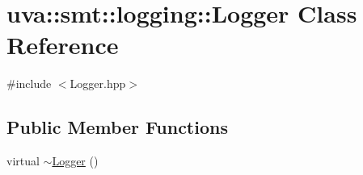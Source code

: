\hypertarget{classuva_1_1smt_1_1logging_1_1_logger}{}\section{uva\+:\+:smt\+:\+:logging\+:\+:Logger Class Reference}
\label{classuva_1_1smt_1_1logging_1_1_logger}


{\ttfamily \#include $<$Logger.\+hpp$>$}

\subsection*{Public Member Functions}
\begin{DoxyCompactItemize}
\item 
virtual \hyperlink{classuva_1_1smt_1_1logging_1_1_logger_a3513d7db6ba5a43f59b56e3396712dbb}{$\sim$\+Logger} ()
\end{DoxyCompactItemize}
